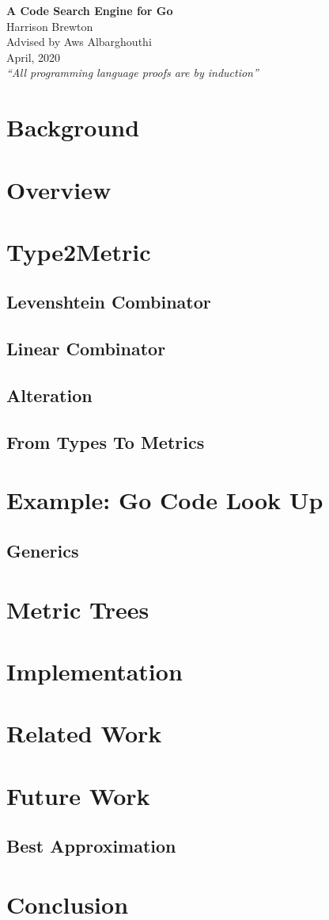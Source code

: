 \documentclass[twocolumn]{article}
\begin{document}
{\centering \Huge \textbf{A Code Search Engine for Go} \\ 
\vspace{0.5cm}
\Large
Harrison Brewton \\
Advised by Aws Albarghouthi \\ 
April, 2020 \\
\normalsize
\vspace{0.1cm} \textit{``All programming language proofs are by induction''} \vspace{0.1cm} \par
}

\section{Background}
\section{Overview}
\section{Type2Metric}
\subsection{Levenshtein Combinator}

\subsection{Linear Combinator}

\subsection{Alteration}

\subsection{From Types To Metrics}

\section{Example: Go Code Look Up}
\subsection{Generics}
\section{Metric Trees}

\section{Implementation}
\section{Related Work}
\section{Future Work}
\subsection{Best Approximation}
\section{Conclusion}



\end{document}
